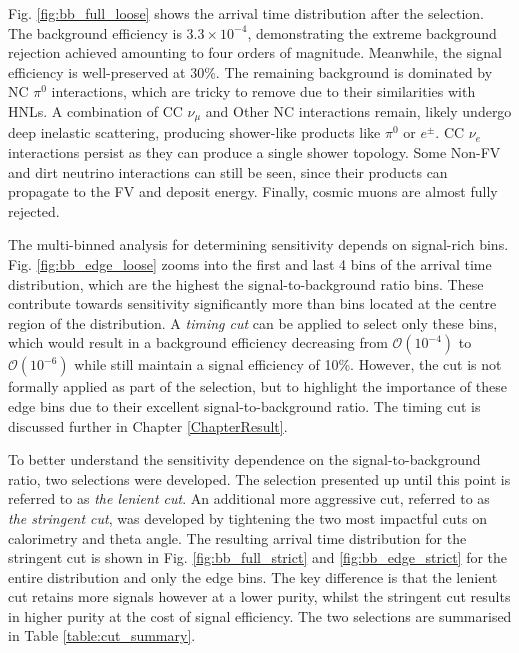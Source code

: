 Fig. \ref{fig:bb_full_loose} shows the arrival time distribution after the selection.
The background efficiency is $3.3 \times 10^{-4}$, demonstrating the extreme background rejection achieved amounting to four orders of magnitude.
Meanwhile, the signal efficiency is well-preserved at $30\%$. 
The remaining background is dominated by NC $\pi^0$ interactions, which are tricky to remove due to their similarities with HNLs.
A combination of CC $\nu_\mu$ and Other NC interactions remain, likely undergo deep inelastic scattering, producing shower-like products like $\pi^0$ or $e^{\pm}$.
CC $\nu_e$ interactions persist as they can produce a single shower topology. 
Some Non-FV and dirt neutrino interactions can still be seen, since their products can propagate to the FV and deposit energy.  
Finally, cosmic muons are almost fully rejected. 

The multi-binned analysis for determining sensitivity depends on signal-rich bins.
Fig. \ref{fig:bb_edge_loose} zooms into the first and last 4 bins of the arrival time distribution, which are the highest the signal-to-background ratio bins.
These contribute towards sensitivity significantly more than bins located at the centre region of the distribution. 
A \textit{timing cut} can be applied to select only these bins, which would result in a background efficiency decreasing from $\mathcal{O}(10^{-4})$ to $\mathcal{O}(10^{-6})$ while still maintain a signal efficiency of 10\%.
However, the cut is not formally applied as part of the selection, but to highlight the importance of these edge bins due to their excellent signal-to-background ratio.
The timing cut is discussed further in Chapter \ref{ChapterResult}.

To better understand the sensitivity dependence on the signal-to-background ratio, two selections were developed.
The selection presented up until this point is referred to as \textit{the lenient cut}.
An additional more aggressive cut, referred to as \textit{the stringent cut}, was developed by tightening the two most impactful cuts on calorimetry and theta angle. 
The resulting arrival time distribution for the stringent cut is shown in Fig. \ref{fig:bb_full_strict} and \ref{fig:bb_edge_strict} for the entire distribution and only the edge bins. 
The key difference is that the lenient cut retains more signals however at a lower purity, whilst the stringent cut results in higher purity at the cost of signal efficiency.
The two selections are summarised in Table \ref{table:cut_summary}.

